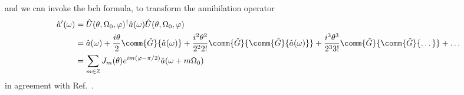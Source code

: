 and we can invoke the \gls{bch} formula, to transform the annihilation operator
\begin{equation}
	\begin{split}
		\hat{a}^\prime(\omega)
		&=
		\hat{U}(\theta,\Omega_0,\varphi)^\dagger
		\hat{a}(\omega)
		\hat{U}(\theta,\Omega_0,\varphi)
		\\
		&=
		\hat{a}(\omega)
		+
		\frac{i\theta}{2}
		\comm{\hat{G}}{\hat{a}(\omega)}
		+
		\frac{i^2\theta^2}{2^22!}
		\comm{\hat{G}}{\comm{\hat{G}}{\hat{a}(\omega)}}
		+
		\frac{i^3\theta^3}{2^33!}
		\comm{\hat{G}}{\comm{\hat{G}}{\dots}}
		+
		\dots
		\\
		&=
		\sum_{m\in\mathbb{Z}}
		J_m(\theta)
		e^{im(\varphi-\pi/2)}
		\hat{a}(\omega+m\Omega_0)
	\end{split}
	\label{eq:frequency_conversion_annihilation}
\end{equation}
in agreement with Ref.~\cite[eq.~40]{Horoshko2018}.

